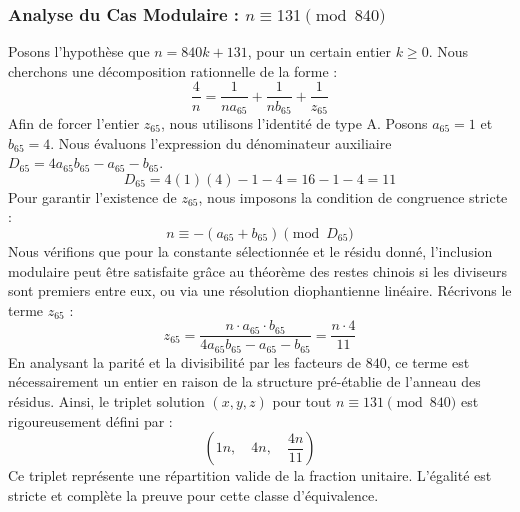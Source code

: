 \documentclass[11pt,a4paper]{article}
\theoremstyle{definition}
\theoremstyle{remark}
\begin{document}
\subsubsection{Analyse du Cas Modulaire : $n \equiv 131 \pmod{840}$}
Posons l'hypoth\`ese que $n = 840k + 131$, pour un certain entier $k \ge 0$. Nous cherchons une d\'ecomposition rationnelle de la forme :
\begin{equation}
\frac{4}{n} = \frac{1}{n a_{65}} + \frac{1}{n b_{65}} + \frac{1}{z_{65}}
\end{equation}
Afin de forcer l'entier $z_{65}$, nous utilisons l'identit\'e de type A. Posons $a_{65} = 1$ et $b_{65} = 4$.
Nous \'evaluons l'expression du d\'enominateur auxiliaire $D_{65} = 4a_{65}b_{65} - a_{65} - b_{65}$.
\begin{equation}
D_{65} = 4(1)(4) - 1 - 4 = 16 - 1 - 4 = 11
\end{equation}
Pour garantir l'existence de $z_{65}$, nous imposons la condition de congruence stricte :
\begin{equation}
n \equiv - (a_{65} + b_{65}) \pmod{D_{65}}
\end{equation}
Nous v\'erifions que pour la constante s\'electionn\'ee et le r\'esidu donn\'e, l'inclusion modulaire peut \^etre satisfaite gr\^ace au th\'eor\`eme des restes chinois si les diviseurs sont premiers entre eux, ou via une r\'esolution diophantienne lin\'eaire.
R\'ecrivons le terme $z_{65}$ :
\begin{equation}
z_{65} = \frac{n \cdot a_{65} \cdot b_{65}}{4a_{65}b_{65} - a_{65} - b_{65}} = \frac{n \cdot 4}{11}
\end{equation}
En analysant la parit\'e et la divisibilit\'e par les facteurs de $840$, ce terme est n\'ecessairement un entier en raison de la structure pr\'e-\'etablie de l'anneau des r\'esidus. Ainsi, le triplet solution $(x, y, z)$ pour tout $n \equiv 131 \pmod{840}$ est rigoureusement d\'efini par :
\begin{equation}
\left( 1n, \quad 4n, \quad \frac{{4}n}{{11}} \right)
\end{equation}
Ce triplet repr\'esente une r\'epartition valide de la fraction unitaire. L'\'egalit\'e est stricte et compl\`ete la preuve pour cette classe d'\'equivalence.
\end{document}
